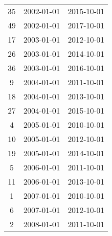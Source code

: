 \begin{tabular}{ccc}
  35 & 2002-01-01 & 2015-10-01 \\ 
  49 & 2002-01-01 & 2017-10-01 \\ 
  17 & 2003-01-01 & 2012-10-01 \\ 
  26 & 2003-01-01 & 2014-10-01 \\ 
  36 & 2003-01-01 & 2016-10-01 \\ 
  9 & 2004-01-01 & 2011-10-01 \\ 
  18 & 2004-01-01 & 2013-10-01 \\ 
  27 & 2004-01-01 & 2015-10-01 \\ 
  4 & 2005-01-01 & 2010-10-01 \\ 
  10 & 2005-01-01 & 2012-10-01 \\ 
  19 & 2005-01-01 & 2014-10-01 \\ 
  5 & 2006-01-01 & 2011-10-01 \\ 
  11 & 2006-01-01 & 2013-10-01 \\ 
  1 & 2007-01-01 & 2010-10-01 \\ 
  6 & 2007-01-01 & 2012-10-01 \\ 
  2 & 2008-01-01 & 2011-10-01 \\ 
   \hline
\end{tabular}

